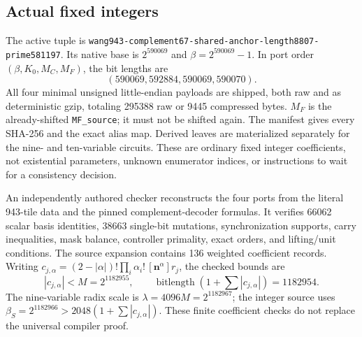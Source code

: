 \documentclass[11pt]{article}
\begin{document}
\subsection{Actual fixed integers}
The active tuple is
\texttt{wang943-complement67-shared-anchor-length8807-prime581197}.
Its native base is $2^{590069}$ and $\beta=2^{590069}-1$. In port order
$(\beta,K_0,M_C,M_F)$, the bit lengths are
\[
(590069,592884,590069,590070).
\]
All four minimal unsigned little-endian payloads are shipped, both raw and
as deterministic gzip, totaling 295388 raw or 9445 compressed bytes.
$M_F$ is the already-shifted \texttt{MF\_source}; it must not be shifted again.
The manifest gives every SHA-256 and the exact alias map. Derived leaves
are materialized separately for the nine- and ten-variable circuits.
These are ordinary fixed integer coefficients, not existential parameters,
unknown enumerator indices, or instructions to wait for a consistency decision.

An independently authored checker reconstructs the four ports from the
literal 943-tile data and the pinned complement-decoder formulas. It verifies
66062 scalar basis identities, 38663 single-bit mutations, synchronization
supports, carry inequalities, mask balance, controller primality, exact
orders, and lifting/unit conditions. The source expansion contains 136
weighted coefficient records. Writing
$c_{j,\alpha}=(2-|\alpha|)!\prod_i\alpha_i!\,[\mathbf n^\alpha]r_j$,
the checked bounds are
\[
|c_{j,\alpha}|<M=2^{1182955},\qquad
\operatorname{bitlength}\left(1+\sum|c_{j,\alpha}|\right)=1182954.
\]
The nine-variable radix scale is $\lambda=4096M=2^{1182967}$; the
integer source uses $\beta_S=2^{1182966}>2048(1+\sum|c_{j,\alpha}|)$.
These finite coefficient checks do not replace the universal compiler proof.








\end{document}

